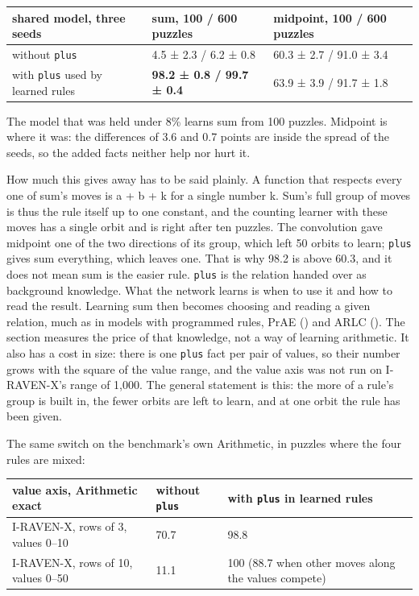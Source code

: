 \begin{center}\small
\begin{tabularx}{\linewidth}{@{}YYY@{}}
\toprule
shared model, three seeds & sum, 100 / 600 puzzles & midpoint, 100 / 600 puzzles \\
\midrule
without \texttt{plus} & 4.5 ± 2.3 / 6.2 ± 0.8 & 60.3 ± 2.7 / 91.0 ± 3.4 \\
with \texttt{plus} used by learned rules & \textbf{98.2 ± 0.8 / 99.7 ± 0.4} & 63.9 ± 3.9 / 91.7 ± 1.8 \\
\bottomrule
\end{tabularx}
\end{center}

The model that was held under 8\% learns sum from 100 puzzles. Midpoint is where it was: the differences of 3.6 and 0.7 points are inside the spread of the seeds, so the added facts neither help nor hurt it.

How much this gives away has to be said plainly. A function that respects every one of sum's moves is a + b + k for a single number k. Sum's full group of moves is thus the rule itself up to one constant, and the counting learner with these moves has a single orbit and is right after ten puzzles. The convolution gave midpoint one of the two directions of its group, which left 50 orbits to learn; \texttt{plus} gives sum everything, which leaves one. That is why 98.2 is above 60.3, and it does not mean sum is the easier rule. \texttt{plus} is the relation handed over as background knowledge. What the network learns is when to use it and how to read the result. Learning sum then becomes choosing and reading a given relation, much as in models with programmed rules, PrAE (\citealp{zhang2021abstract}) and ARLC (\citealp{camposampiero2024towards}). The section measures the price of that knowledge, not a way of learning arithmetic. It also has a cost in size: there is one \texttt{plus} fact per pair of values, so their number grows with the square of the value range, and the value axis was not run on I-RAVEN-X's range of 1,000. The general statement is this: the more of a rule's group is built in, the fewer orbits are left to learn, and at one orbit the rule has been given.

The same switch on the benchmark's own Arithmetic, in puzzles where the four rules are mixed:

\begin{center}\small
\begin{tabularx}{\linewidth}{@{}YlY@{}}
\toprule
value axis, Arithmetic exact & without \texttt{plus} & with \texttt{plus} in learned rules \\
\midrule
I-RAVEN-X, rows of 3, values 0–10 & 70.7 & 98.8 \\
I-RAVEN-X, rows of 10, values 0–50 & 11.1 & 100 (88.7 when other moves along the values compete) \\
\bottomrule
\end{tabularx}
\end{center}

